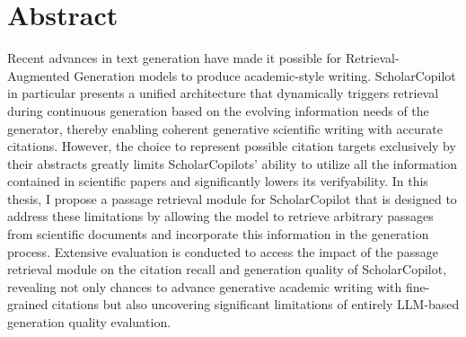 \documentclass[
    a4paper,
    cleardoubleempty,
    BCOR1cm
]{scrbook}
\begin{document}


\chapter*{Abstract}
Recent advances in text generation have made it possible for Retrieval-Augmented Generation models to produce academic-style writing. ScholarCopilot in particular presents a unified architecture that dynamically triggers retrieval during continuous generation based on the evolving information needs of the generator, thereby enabling coherent generative scientific writing with accurate citations. However, the choice to represent possible citation targets exclusively by their abstracts greatly limits ScholarCopilots' ability to utilize all the information contained in scientific papers and significantly lowers its verifyability. In this thesis, I propose a passage retrieval module for ScholarCopilot that is designed to address these limitations by allowing the model to retrieve arbitrary passages from scientific documents and incorporate this information in the generation process. Extensive evaluation is conducted to access the impact of the passage retrieval module on the citation recall and generation quality of ScholarCopilot, revealing not only chances to advance generative academic writing with fine-grained citations but also uncovering significant limitations of entirely LLM-based generation quality evaluation.

\tableofcontents








% 


\appendix

\end{document}
